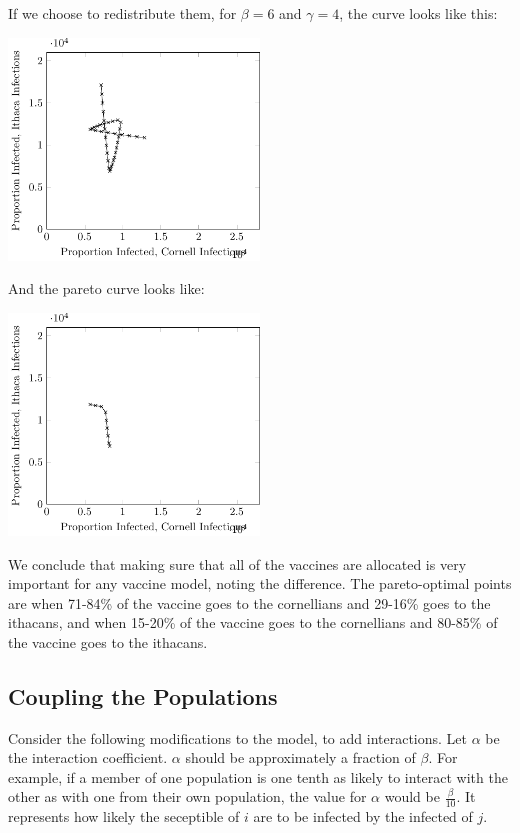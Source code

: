 \documentclass[titlepage]{article}
\begin{document}
If we choose to redistribute them, for $\beta = 6$ and $\gamma = 4$,
	the curve looks like this:

\includegraphics[width=0.5\textwidth]{figures/sir-pareto-top.pdf}

And the pareto curve looks like:

\includegraphics[width=0.5\textwidth]{figures/sir-pareto-top-pareto.pdf}

We conclude that making sure that all of the vaccines are allocated is very
	important for any vaccine model, noting the difference.
The pareto-optimal points are when 71-84\% of the vaccine goes to the
	cornellians and 29-16\% goes to the ithacans,
	and when 15-20\% of the vaccine goes to the cornellians
	and 80-85\% of the vaccine goes to the ithacans.

\subsection{Coupling the Populations}

Consider the following modifications to the model, to add interactions.
Let $\alpha$ be the interaction coefficient.
$\alpha$ should be approximately a fraction of $\beta$.
For example, if a member of one population is one tenth as likely
	to interact with the other as with one from their own population,
	the value for $\alpha$ would be $\frac{\beta}{10}$.
It represents how likely the seceptible of $i$ are to be infected by the
	infected of $j$.
\end{document}
